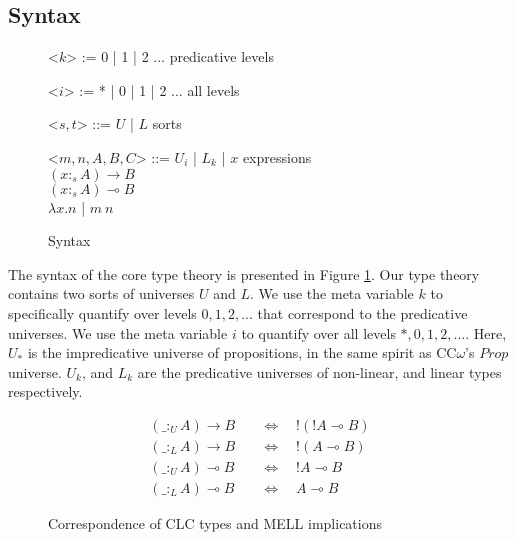 \documentclass[sigplan,screen,review,authordraft]{acmart}
\theoremstyle{definition}
\newcommand{\indalt}[1][2]{\\\hspace*{-1.2em}\textbar\quad}
\newcommand{\utype}{:_{\scriptscriptstyle U}}
\newcommand{\ltype}{:_{\scriptscriptstyle L}}
\begin{document}
  \subsection{Syntax}
  \begin{figure}[h]
    \vspace{-1em}
    \caption{Syntax}
    \vspace{1.5em}
    \begin{grammar}
      <$k$> := 0 | 1 | 2 ... \phantom{* |} \hspace*{3em} predicative levels

      <$i$> := * | 0 | 1 | 2 ... \hspace*{3em} all levels

      <$s, t$> ::= $U$ | $L$ \phantom{| $x$} \hspace*{4.6em} sorts

      <$m, n, A, B, C$> ::= $U_i$ | $L_k$ | $x$ \hspace*{4em} expressions
      \indalt $(x :_s A) \rightarrow B$
      \indalt $(x :_s A) \multimap B$
      \indalt $\lambda x. n$ | $m\ n$
    \end{grammar}
    \label{syntax}
  \end{figure}
  The syntax of the core type theory is presented in Figure \ref{syntax}. Our type theory contains two sorts of universes $U$ and $L$. We use the meta variable $k$ to specifically quantify over levels $0, 1, 2, ...$ that correspond to the predicative universes. We use the meta variable $i$ to quantify over all levels $*, 0, 1, 2, ...$. Here, $U_*$ is the impredicative universe of propositions, in the same spirit as CC$\omega$'s $Prop$ universe. $U_k$, and $L_k$ are the predicative universes of non-linear, and linear types respectively.
  \begin{figure}[H]
    \vspace{-1em}
    \caption{Correspondence of CLC types and MELL implications}
    \Description{}
    \vspace{-1em}
    \begin{align}
      (\_ \utype A) \rightarrow B \quad &\Leftrightarrow \quad !(!A \multimap B) \\
      (\_ \ltype A) \rightarrow B \quad &\Leftrightarrow \quad !(A \multimap B) \\
      (\_ \utype A) \multimap B \quad &\Leftrightarrow \quad !A \multimap B \\
      (\_ \ltype A) \multimap B \quad &\Leftrightarrow \quad A \multimap B
    \end{align}
    \vspace{-1em}
    \label{correspondence}
  \end{figure}
\end{document}
